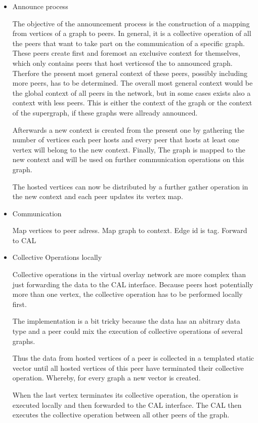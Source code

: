\begin{itemize}
\item Announce process

  The objective of the announcement process is the construction of a
  mapping from vertices of a graph to peers. In general, it is a
  collective operation of all the peers that want to take part on the
  communication of a specific graph.  These peers create first and
  foremost an exclusive context for themselves, which only contains
  peers that host verticesof the to announced graph.  Therfore the
  present most general context of these peers, possibly including more
  peers, has to be determined.  The overall most general context would
  be the global context of all peers in the network, but in some cases
  exists also a context with less peers. This is either the context of
  the graph or the context of the supergraph, if these graphs were
  allready announced.

  Afterwards a new context is created from the present one by
  gathering the number of vertices each peer hosts and every peer that
  hosts at least one vertex will belong to the new context.  Finally,
  The graph is mapped to the new context and will be used on further
  communication operations on this graph.

  The hosted vertices can now be distributed by a further gather
  operation in the new context and each peer updates its vertex map.

\item Communication

  Map vertices to peer adress.  Map graph to context.  Edge id is tag.
  Forward to CAL

\item Collective Operations locally

  Collective operations in the virtual overlay network are more
  complex than just forwarding the data to the CAL interface. Because
  peers host potentially more than one vertex, the collective
  operation has to be performed locally first.

  The implementation is a bit tricky because the data has an abitrary
  data type and a peer could mix the execution of collective
  operations of several graphs.

  Thus the data from hosted vertices of a peer is collected in a
  templated static vector until all hosted vertices of this peer have
  terminated their collective operation. Whereby, for every graph a
  new vector is created.

  When the last vertex terminates its collective operation, the
  operation is executed locally and then forwarded to the CAL
  interface. The CAL then executes the collective operation between
  all other peers of the graph.


\end{itemize}

